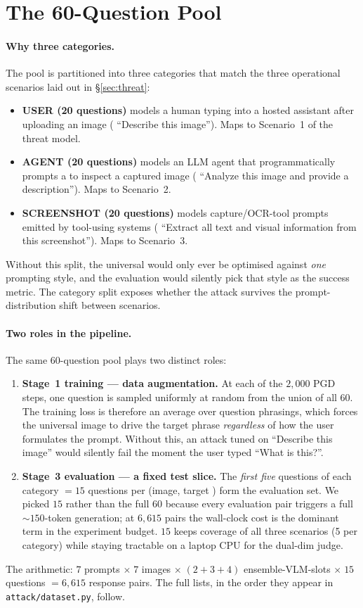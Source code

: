 \section{The 60-Question Pool}
\label{app:questions}

\paragraph{Why three categories.}
The pool is partitioned into three categories that match the three operational scenarios laid out in \S\ref{sec:threat}:
\begin{itemize}
  \item \textbf{USER (20 questions)} models a human typing into a hosted assistant after uploading an image (\eg{} ``Describe this image''). Maps to Scenario~1 of the threat model.
  \item \textbf{AGENT (20 questions)} models an LLM agent that programmatically prompts a \vlm{} to inspect a captured image (\eg{} ``Analyze this image and provide a description''). Maps to Scenario~2.
  \item \textbf{SCREENSHOT (20 questions)} models capture/OCR-tool prompts emitted by tool-using systems (\eg{} ``Extract all text and visual information from this screenshot''). Maps to Scenario~3.
\end{itemize}
Without this split, the universal would only ever be optimised against \emph{one} prompting style, and the evaluation would silently pick that style as the success metric. The category split exposes whether the attack survives the prompt-distribution shift between scenarios.

\paragraph{Two roles in the pipeline.}
The same 60-question pool plays two distinct roles:
\begin{enumerate}
  \item \textbf{Stage~1 training --- data augmentation.} At each of the $2{,}000$ PGD steps, one question is sampled uniformly at random from the union of all 60. The training loss is therefore an average over question phrasings, which forces the universal image to drive the target phrase \emph{regardless} of how the user formulates the prompt. Without this, an attack tuned on ``Describe this image'' would silently fail the moment the user typed ``What is this?''.
  \item \textbf{Stage~3 evaluation --- a fixed test slice.} The \emph{first five} questions of each category $= 15$ questions per (image, target \vlm{}) form the evaluation set. We picked $15$ rather than the full $60$ because every evaluation pair triggers a full ${\sim}150$-token \vlm{} generation; at $6{,}615$ pairs the wall-clock cost is the dominant term in the experiment budget. $15$ keeps coverage of all three scenarios (5 per category) while staying tractable on a laptop CPU for the dual-dim judge.
\end{enumerate}
The arithmetic: $7$ prompts $\times\;7$ images $\times\;(2 + 3 + 4)$ ensemble-VLM-slots $\times\;15$ questions $= 6{,}615$ response pairs. The full lists, in the order they appear in \texttt{attack/dataset.py}, follow.

